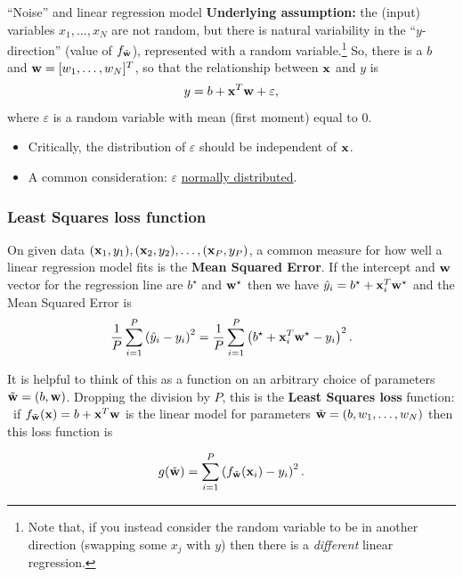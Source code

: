 \documentclass{beamer}
\theoremstyle{example}
\begin{document}
\begin{frame}{``Noise'' and linear regression model}
    \textbf{Underlying assumption:} the (input) variables $x_1,\ldots,x_N$ are not random, but there is natural variability in the ``$y$-direction'' (value of $f_{\tilde{\bf w}}$), represented with a random variable.\footnote{Note that, if you instead consider the random variable to be in another direction (swapping some $x_j$ with $y$) then there is a \emph{different} linear regression.} \newline 
    \pause
    So, there is a $b$ and ${\bf w} = [w_1,\ldots, w_N]^T$, so that the relationship between ${\bf x}$ and $y$ is 
    \[y = b + {\bf x}^T{\bf w} + \varepsilon,\]
    where $\varepsilon$ is a random variable with mean (first moment) equal to $0$. 
    \pause
    \begin{itemize}
        \item Critically, the distribution of $\varepsilon$ should be independent of ${\bf x}$. 
        \pause
        \item A common consideration: $\varepsilon$ \href{https://en.wikipedia.org/wiki/Normal_distribution}{normally distributed}.
    \end{itemize}
\end{frame}

\begin{frame}
    \frametitle{Least Squares loss function}
    On given data $({\bf x}_1, y_1), ({\bf x}_2, y_2), \ldots, ({\bf x}_P, y_P)$, a common measure for how well a linear regression model fits is the \textbf{Mean Squared Error}. If the intercept and ${\bf w}$ vector for the regression line are $b^\star$ and ${\bf w}^\star$ then we have $\hat{y}_i = b^\star + {\bf x}_i^T{\bf w}^\star$ and the Mean Squared Error is 
        \[\frac1{P}\sum_{i=1}^P\left(\hat{y}_i - y_i\right)^2 = \frac1{P}\sum_{i=1}^P\left(b^\star + {\bf x}_i^T{\bf w}^\star - y_i\right)^2.\]
    
    \pause
    It is helpful to think of this as a function on an arbitrary choice of parameters $\tilde{\bf w} = (b, {\bf w})$.  Dropping the division by $P$, this is the \textbf{Least Squares loss} function: \pause\ if $f_{\tilde{\bf w}}({\bf x}) = b + {\bf x}^T{\bf w}$ is the linear model for parameters $\tilde{\bf w}=(b,w_1,\ldots,w_N)$ then this loss function is  
    
        \[g(\tilde{\bf w}) = \sum_{i=1}^P\left(f_{\tilde{\bf w}}({\bf x}_i) - y_i\right)^2.\]
    
\end{frame}
\end{document}
